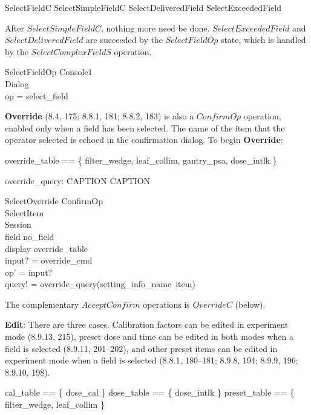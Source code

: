 \begin{zed} 
	SelectFieldC  
	 SelectSimpleFieldC \lor SelectDeliveredField \lor SelectExceededField
\end{zed}
After $SelectSimpleFieldC$, nothing more need be done.
$SelectExceededField$ and $SelectDeliveredField$ are succeeded by the 
$SelectFieldOp$ state, which is handled by the $SelectComplexFieldS$
operation.  

\begin{schema}{SelectFieldOp}
	Console1 \\
	Dialog \\
\where
	op = select\_field
\end{schema}

{\bf Override} (8.4, 175; 8.8.1, 181; 8.8.2, 183) is also a $ConfirmOp$
operation, enabled only when a field has been selected.  The name of
the item that the operator selected is echoed in the confirmation
dialog.  To begin {\bf Override}:

\begin{zed}
override\_table == \{ filter\_wedge, leaf\_collim, gantry\_psa, dose\_intlk \}
\end{zed}

\begin{axdef}
	override\_query: CAPTION \fun CAPTION
\end{axdef}

\begin{schema}{SelectOverride}
	ConfirmOp \\
	SelectItem \\
	\Xi Session \\
\where
	field \neq no\_field \\
	display \in override\_table \\
	input? = override\_cmd \\
	op' = input? \\
	query! = override\_query(setting\_info\_name~item)
\end{schema}
The complementary $AcceptConfirm$ operations is $OverrideC$ (below).

{\bf Edit}: There are three cases.  Calibration factors can be edited
in experiment mode (8.9.13, 215), preset dose and time can be edited
in both modes when a field is selected (8.9.11, 201--202), and other
preset items can be edited in experiment mode when a field is selected
(8.8.1, 180--181; 8.9.8, 194; 8.9.9, 196; 8.9.10, 198).

\begin{zed}
	cal\_table == \{ dose\_cal \}
\also
	dose\_table == \{ dose\_intlk \}
\also
	preset\_table == \{ filter\_wedge, leaf\_collim \}
\end{zed}

